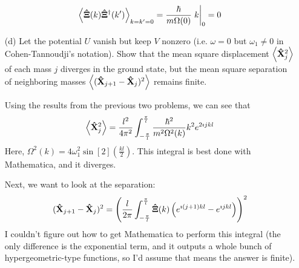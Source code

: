 \documentclass[a4paper,twoside]{article}
\begin{document}
\begin{itemize}
\begin{problem}
\begin{equation}
                \ev{ \vu{\Xi}(k) \vu{\Xi}^\dagger(k')}_{k=k'=0} = \frac{\hbar}{m \Omega(0)} \eval{k}_{0} = 0
            \end{equation}
        \end{problem}
    \item[(d)] Let the potential $ U $ vanish but keep $ V $ nonzero (i.e. $ \omega = 0 $ but $ \omega_1 \neq 0 $ in Cohen-Tannoudji's notation). Show that the mean square displacement $ \ev{ \vu{X}_j^2} $ of each mass $ j $ diverges in the ground state, but the mean square separation of neighboring masses $ \ev{( \vu{X}_{j+1} - \vu{X}_{j})^2} $ remains finite.
        \begin{problem}
            Using the results from the previous two problems, we can see that
            \begin{equation}
                \ev{ \vu{X}_j^2} = \frac{l^2}{4 \pi^2} \int_{- \frac{\pi}{l}}^{ \frac{\pi}{l}} \frac{\hbar^2}{m^2 \Omega^2(k)} k^2 e^{2\imath j k l}
            \end{equation}
            Here, $ \Omega^2(k) = 4 \omega_1^2 \sin[2](\frac{kl}{2}) $. This integral is best done with Mathematica, and it diverges.

            Next, we want to look at the separation:
            \begin{equation}
                ( \vu{X}_{j+1} - \vu{X}_{j})^2 = \left( \frac{l}{2 \pi} \int_{- \frac{\pi}{l}}^{ \frac{\pi}{l}} \vu{\Xi}(k) \left( e^{\imath (j+1) k l} - e^{\imath j k l} \right) \right)^2
            \end{equation}
            I couldn't figure out how to get Mathematica to perform this integral (the only difference is the exponential term, and it outputs a whole bunch of hypergeometric-type functions, so I'd assume that means the answer is finite).
        \end{problem}
\end{itemize}
\end{document}
